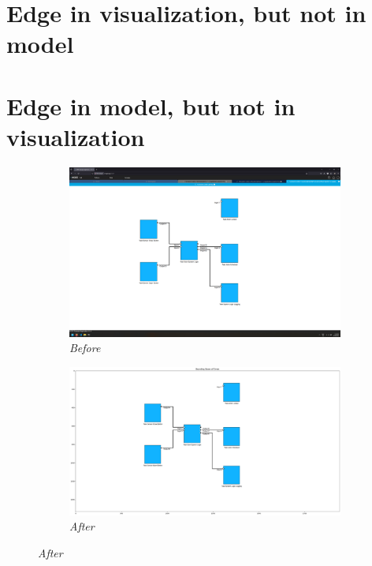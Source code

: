 \documentclass{article}
\begin{document}
\section{Edge in visualization, but not in model}

\newpage

\section{Edge in model, but not in visualization}
\begin{figure}[H]
    \centering
    \begin{subfigure}[t]{0.9\textwidth}
        \centering
        \includegraphics[width=\textwidth]{testcases/edge_in_model_not_in_visualization/152413-910376_input_image.png}
        \caption*{\textit{Before}}
    \end{subfigure}
    \newline    
    \begin{subfigure}[t]{0.9\textwidth}
        \centering
        \includegraphics[width=\textwidth]{testcases/edge_in_model_not_in_visualization/152427-029742_element_bbox_errors_labeled_colored.png}
        \caption*{\textit{After}}
    \end{subfigure}
    \label{fig:edge_in_model_not_viz}
\end{figure}
\newpage
\end{document}
